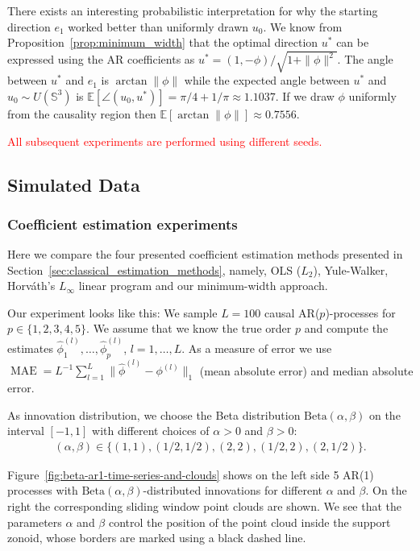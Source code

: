 
There exists an interesting probabilistic interpretation for why the starting direction $e_1$ worked better than uniformly drawn $u_0$. We know from Proposition~\ref{prop:minimum_width} that the optimal direction $u^{\ast}$ can be expressed using the AR coefficients as $u^{\ast}=(1,-\phi)/\sqrt{1+\|\phi\|^2}$. The angle between $u^{\ast}$ and $e_1$ is $\arctan{\|\phi\|}$ while the expected angle between $u^{\ast}$ and $u_0\sim U(\mathbb{S}^{3})$ is $\mathbb{E}[\angle{(u_0,u^{\ast})}]=\pi/4+1/\pi\approx1.1037$. If we draw $\phi$ uniformly from the causality region then $\mathbb{E}[\arctan{\|\phi\|}]\approx0.7556$.

\textcolor{red}{All subsequent experiments are performed using different seeds.}

\subsection{Simulated Data}

\subsubsection{Coefficient estimation experiments}

Here we compare the four presented coefficient estimation methods presented in Section~\ref{sec:classical_estimation_methods}, namely, OLS ($L_2$), Yule-Walker, Horváth's $L_{\infty}$ linear program and our minimum-width approach.

Our experiment looks like this: We sample $L=100$ causal AR($p$)-processes for $p\in\{1,2,3,4,5\}$. We assume that we know the true order $p$ and compute the estimates $\hat{\phi}_1^{(l)},\dots,\hat{\phi}_p^{(l)}$, $l=1,\dots,L$. As a measure of error we use $\operatorname{MAE}=L^{-1}\sum_{l=1}^{L}\|\hat{\phi}^{(l)}-\phi^{(l)}\|_1$ (mean absolute error) and median absolute error.

As innovation distribution, we choose the Beta distribution $\text{Beta}(\alpha,\beta)$ on the interval $[-1,1]$ with different choices of $\alpha>0$ and $\beta>0$:
\begin{align*}
    (\alpha,\beta)\in\{(1,1),(1/2,1/2),(2,2),(1/2,2),(2,1/2)\}.
\end{align*}

Figure~\ref{fig:beta-ar1-time-series-and-clouds} shows on the left side 5 AR(1) processes with $\text{Beta}(\alpha,\beta)$-distributed innovations for different $\alpha$ and $\beta$. On the right the corresponding sliding window point clouds are shown. We see that the parameters $\alpha$ and $\beta$ control the position of the point cloud inside the support zonoid, whose borders are marked using a black dashed line.

